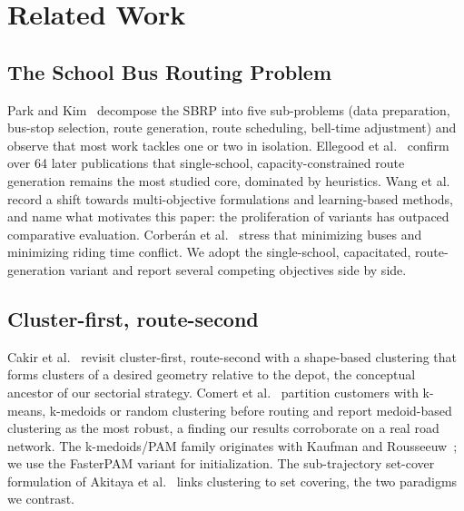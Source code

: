 \documentclass[graybox]{SNmult}
\begin{document}
\section{Related Work}\label{sec:related}
\subsection{The School Bus Routing Problem}
Park and Kim~\cite{Park2010TheReview} decompose the SBRP into five
sub-problems (data preparation, bus-stop selection, route generation,
route scheduling, bell-time adjustment) and observe that most work tackles
one or two in isolation. Ellegood et
al.~\cite{Ellegood2020SchoolDirections} confirm over 64 later publications
that single-school, capacity-constrained route generation remains the most
studied core, dominated by heuristics. Wang et
al.~\cite{Wang2025SBRPReview} record a shift towards multi-objective
formulations and learning-based methods, and name what motivates this
paper: the proliferation of variants has outpaced comparative evaluation.
Corber\'an et al.~\cite{Corberan2002HeuristicObjectives} stress that
minimizing buses and minimizing riding time conflict. We adopt the
single-school, capacitated, route-generation variant and report several
competing objectives side by side.

\subsection{Cluster-first, route-second}
Cakir et al.~\cite{CakirRevisitingProblem} revisit cluster-first,
route-second with a shape-based clustering that forms clusters of a
desired geometry relative to the depot, the conceptual ancestor of our
sectorial strategy. Comert et al.~\cite{Comert2018AStudy} partition
customers with k-means, k-medoids or random clustering before routing and
report medoid-based clustering as the most robust, a finding our results
corroborate on a real road network. The k-medoids/PAM family originates
with Kaufman and Rousseeuw~\cite{KaufmanRousseeuw1990PAM}; we use the
FasterPAM variant for initialization. The sub-trajectory set-cover
formulation of Akitaya et al.~\cite{Akitaya2021Subtrajectory} links
clustering to set covering, the two paradigms we contrast.
\end{document}
